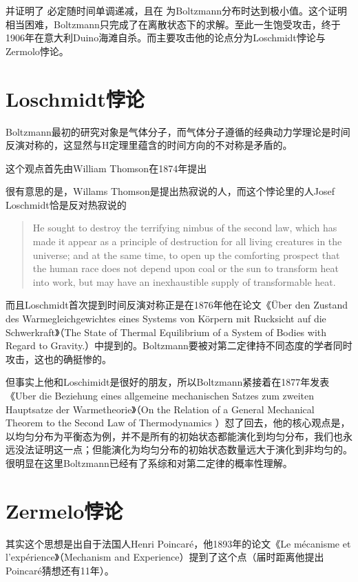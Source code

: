 并证明了  必定随时间单调递减，且在  为Boltzmann分布时达到极小值。这个证明相当困难，Boltzmann只完成了在离散状态下的求解。至此一生饱受攻击，终于1906年在意大利Duino海滩自杀。而主要攻击他的论点分为Loschmidt悖论与Zermolo悖论。


\section{Loschmidt悖论}
Boltzmann最初的研究对象是气体分子，而气体分子遵循的经典动力学理论是时间反演对称的，这显然与H定理里蕴含的时间方向的不对称是矛盾的。

这个观点首先由William Thomson在1874年提出\cite{1}

很有意思的是，Willams Thomson是提出热寂说的人，而这个悖论里的人Josef Loschmidt恰是反对热寂说的

\begin{quote}
	He sought to destroy the terrifying nimbus of the second law, which has made it appear as a principle of destruction for all living creatures in the universe; and at the same time, to open up the comforting prospect that the human race does not depend upon coal or the sun to transform heat into work, but may have an inexhaustible supply of transformable heat.
\end{quote}

而且Loschmidt首次提到时间反演对称正是在1876年他在论文《Über den Zustand des Warmegleichgewichtes eines Systems von Körpern mit Rucksicht auf die Schwerkraft》（The State of Thermal Equilibrium of a System of Bodies with Regard to Gravity.）中提到的。Boltzmann要被对第二定律持不同态度的学者同时攻击，这也的确挺惨的。

但事实上他和Loschimidt是很好的朋友，所以Boltzmann紧接着在1877年发表《Uber die Beziehung eines allgemeine mechanischen Satzes zum zweiten Hauptsatze der Warmetheorie》（On the Relation of a General Mechanical Theorem to the Second Law of Thermodynamics  ）怼了回去，他的核心观点是，以均匀分布为平衡态为例，并不是所有的初始状态都能演化到均匀分布，我们也永远没法证明这一点；但能演化为均匀分布的初始状态数量远大于演化到非均匀的。很明显在这里Boltzmann已经有了系综和对第二定律的概率性理解。

\section{Zermelo悖论}
其实这个思想是出自于法国人Henri Poincaré，他1893年的论文《Le mécanisme et l'expérience》（Mechanism and Experience）提到了这个点（届时距离他提出Poincaré猜想还有11年）。

